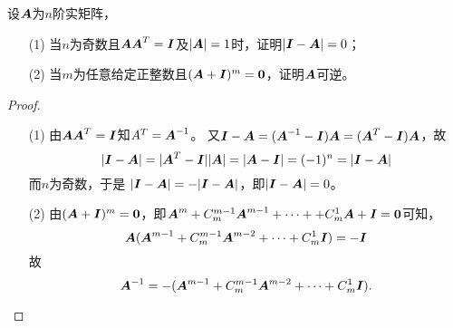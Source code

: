 \begin{frame}

\begin{li}[2005-2006第一学期]
设$\MA$为$n$阶实矩阵，
\begin{itemize}
\item[(1)] 当$n$为奇数且$\MA\MA^T=\MI$及$|\MA|=1$时，证明$|\MI-\MA|=0$；
\item[(2)]  当$m$为任意给定正整数且$(\MA+\MI)^m=\M0$，证明$\MA$可逆。
\end{itemize}
\end{li}
\pause
\begin{proof}
\begin{itemize}
\item[(1)]
由$\MA\MA^T=\MI$知$A^T=\MA^{-1}$。
又$\MI-\MA=(\MA^{-1}-\MI)\MA=(\MA^T-\MI)\MA$，故
$$
|\MI-\MA|=|\MA^T-\MI||\MA|=|\MA-\MI|=(-1)^n=|\MI-\MA|
$$
而$n$为奇数，于是
$
|\MI-\MA|=-|\MI-\MA|
$，即$|\MI-\MA|=0$。\\[0.1in] \pause 
\item[(2)]
由$(\MA+\MI)^m=\M0$，即$\MA^m+C_m^{m-1}\MA^{m-1}+\cd++C_m^{1}\MA+\MI=\M0$可知，
$$
\MA(\MA^{m-1}+C_m^{m-1}\MA^{m-2}+\cd+C_m^{1}\MI)=-\MI
$$
故
$$
\MA^{-1}=-(\MA^{m-1}+C_m^{m-1}\MA^{m-2}+\cd+C_m^{1}\MI).
$$
\end{itemize}
\end{proof}
\end{frame}



